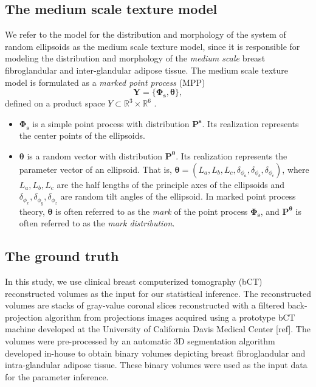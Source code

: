 \documentclass[journal]{IEEEtran}
\begin{document}
\subsection{The medium scale texture model}
\label{chap4-sec1-sub1:math-form-medi}


We refer to the model for the distribution and morphology of the
system of random ellipsoids as the medium scale texture model, since
it is responsible for modeling the distribution and morphology of the
\textit{medium scale} breast fibroglandular and inter-glandular
adipose tissue. The medium scale texture model is formulated as a
\textit{marked point process} (MPP)
$$
\mathbf{Y} = \{ \mathbf{\Phi_{s}},\boldsymbol{\theta} \},
$$
defined on a product space
$Y \subset \mathbb{R}^{3} \times \mathbb{R}^6$
\cite{chiu2013stochastic}.

\begin{itemize}

\item $\mathbf{\Phi_s}$ is a simple point process with distribution
  $\mathbf{P}^{\mathbf{s}}$. Its realization represents the center
  points of the ellipsoids.

\item $\boldsymbol{\theta}$ is a random vector with distribution
  $\mathbf{P}^{\boldsymbol{\theta}}$. Its realization represents the
  parameter vector of an ellipsoid. That is,
  $\boldsymbol{\theta} = \left( L_a, L_b, L_c, \delta_{\phi_a},
    \delta_{\phi_b}, \delta_{\phi_c} \right)$, where $L_a, L_b, L_c$
  are the half lengths of the principle axes of the ellipsoids and
  $\delta_{\phi_{x}},\delta_{\phi_{y}},\delta_{\phi_{z}}$ are random
  tilt angles of the ellipsoid. In marked point process theory,
  $\boldsymbol{\theta}$ is often referred to as the \textit{mark} of
  the point process $\mathbf{\Phi_s}$, and
  $\mathbf{P}^{\boldsymbol{\theta}}$ is often referred to as the
  \textit{mark distribution}.
\end{itemize}

\subsection{The ground truth}
\label{chap4-sec1-sub2:ground-truth}

In this study, we use clinical breast computerized tomography (bCT)
reconstructed volumes as the input for our statistical inference. The
reconstructed volumes are stacks of gray-value coronal slices
reconstructed with a filtered back-projection algorithm from
projections images acquired using a prototype bCT machine developed at
the University of California Davis Medical Center [ref]. The volumes
were pre-processed by an automatic 3D segmentation algorithm developed
in-house to obtain binary volumes depicting breast fibroglandular and
intra-glandular adipose tissue. These binary volumes were used as the
input data for the parameter inference.
\end{document}
